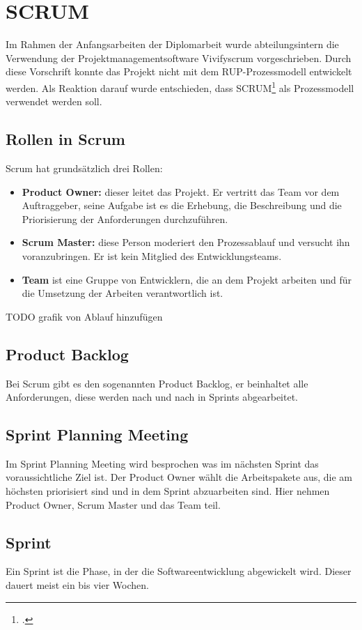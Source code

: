 \section{SCRUM}
Im Rahmen der Anfangsarbeiten der Diplomarbeit wurde abteilungsintern die Verwendung der Projektmanagementsoftware Vivifyscrum vorgeschrieben. Durch diese Vorschrift konnte das Projekt nicht mit dem RUP-Prozessmodell entwickelt werden. 
Als Reaktion darauf wurde entschieden, dass SCRUM\footcite{Lehrunterlagen-SCRUM} als Prozessmodell verwendet werden soll.
\subsection{Rollen in Scrum}
Scrum hat grundsätzlich drei Rollen:
\begin{itemize} 
	\item \textbf{Product Owner:} dieser leitet das Projekt. Er vertritt das Team vor dem Auftraggeber, seine Aufgabe ist es die Erhebung, die Beschreibung und die Priorisierung der Anforderungen durchzuführen.
	\item \textbf{Scrum Master:} diese Person moderiert den Prozessablauf und versucht ihn voranzubringen. Er ist kein Mitglied des Entwicklungsteams.
	\item \textbf{Team} ist eine Gruppe von Entwicklern, die an dem Projekt arbeiten und für die Umsetzung der Arbeiten verantwortlich ist.
\end{itemize}
TODO grafik von Ablauf hinzufügen
\subsection{Product Backlog}
Bei Scrum gibt es den sogenannten Product Backlog, er beinhaltet alle Anforderungen, diese werden nach und nach in Sprints abgearbeitet.
\subsection{Sprint Planning Meeting}
Im Sprint Planning Meeting wird besprochen was im nächsten Sprint das voraussichtliche Ziel ist. Der Product Owner wählt die Arbeitspakete aus, die am höchsten priorisiert sind und in dem Sprint abzuarbeiten sind. Hier nehmen Product Owner, Scrum Master und das Team teil. 
\subsection{Sprint}
Ein Sprint ist die Phase, in der die Softwareentwicklung abgewickelt wird. Dieser dauert meist ein bis vier Wochen. 
